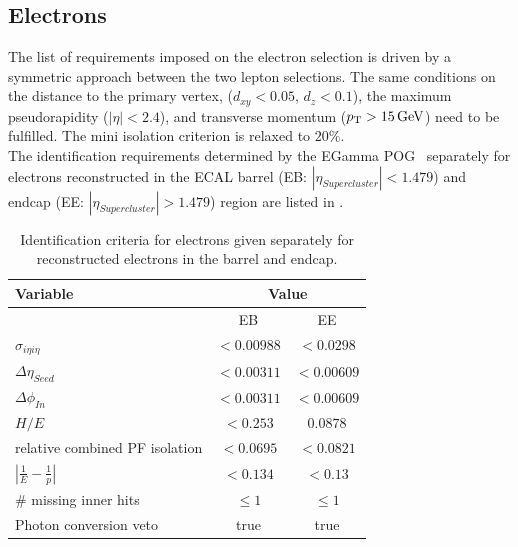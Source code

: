 \subsection{Electrons}
The list of requirements imposed on the electron selection is driven by a symmetric approach between the two lepton selections. The same conditions on the distance to the primary vertex, ($d_{xy}<0.05$, $d_z<0.1$), the maximum pseudorapidity ($|\eta|<2.4$), and transverse momentum ($p_{\mathrm{T}}>15\,\text{Ge\hspace{-.08em}V}$) need to be fulfilled. The mini isolation criterion is relaxed to $20\%$.\\
The identification requirements determined by the EGamma POG~\cite{ElectronID} separately for electrons reconstructed in the ECAL barrel (EB: $|\eta_{Supercluster}|<1.479$) and endcap (EE: $|\eta_{Supercluster}|>1.479$) region are listed in .
\begin{table}[h!]
 \centering
 \caption{Identification criteria for electrons given separately for reconstructed electrons in the barrel and endcap.}
 \label{tab:eleID}
 \begin{tabular}{lcc}
  Variable                       & \multicolumn{2}{c}{Value}              \\\hline
                                 & EB                        & EE         \\\hline
  $\sigma_{i\eta i\eta}$         & $<0.00988$                & $<0.0298$  \\
  $\Delta\eta_{Seed}$            & $<0.00311$                & $<0.00609$ \\
  $\Delta\phi_{In}$              & $<0.00311$                & $<0.00609$ \\
  $H/E$                          & $<0.253$                  & $0.0878$   \\
  relative combined PF isolation & $<0.0695$                 & $<0.0821$  \\
  $|\frac{1}{E}-\frac{1}{p}|$    & $<0.134$                  & $<0.13$    \\
  \# missing inner hits          & $\leq1$                   & $\leq1$    \\
  Photon conversion veto         & true                      & true       \\\hline
 \end{tabular}
\end{table}
